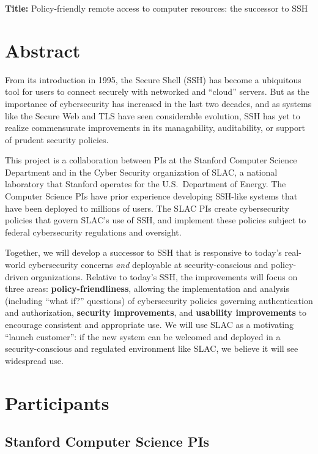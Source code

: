 \documentclass[11pt]{article}
\begin{document}
\noindent \textbf{Title:} Policy-friendly remote access to computer resources: the successor to SSH

\vspace{-.5\baselineskip}

\section*{Abstract}

From its introduction in 1995, the Secure Shell (SSH) has become a
ubiquitous tool for users to connect securely with networked and
``cloud'' servers. But as the importance of cybersecurity has
increased in the last two decades, and as systems like the Secure Web
and TLS have seen considerable evolution, SSH has yet to realize
commensurate improvements in its managability, auditability, or
support of prudent security policies.

This project is a collaboration between PIs at the Stanford Computer
Science Department and in the Cyber Security organization of SLAC, a
national laboratory that Stanford operates for the U.S.~Department of
Energy. The Computer Science PIs have prior experience developing
SSH-like systems that have been deployed to millions of users. The
SLAC PIs create cybersecurity policies that govern SLAC's use of SSH,
and implement these policies subject to federal cybersecurity regulations and oversight.

Together, we will develop a successor to SSH that is responsive to
today's real-world cybersecurity concerns \emph{and} deployable at
security-conscious and policy-driven organizations. Relative to
today's SSH, the improvements will focus on three areas:
\textbf{policy-friendliness}, allowing the implementation and analysis
(including ``what if?'' questions) of cybersecurity policies governing
authentication and authorization, \textbf{security improvements}, and
\textbf{usability improvements} to encourage consistent and
appropriate use. We will use SLAC as a motivating ``launch customer'':
if the new system can be welcomed and deployed in a security-conscious
and regulated environment like SLAC, we believe it will see widespread
use.

\vspace{-.5\baselineskip}

\section{Participants}

\subsection{Stanford Computer Science PIs}
\end{document}
